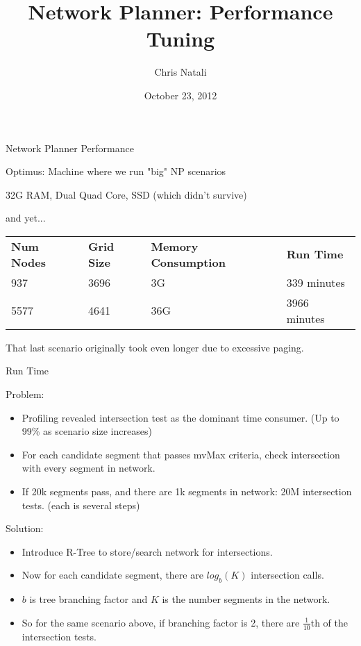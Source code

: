 \documentclass{beamer}
\title{Network Planner:  Performance Tuning}
\author{Chris Natali}
\institute{Modi Labs at Columbia University}
\date{October 23, 2012}
\begin{document}
\begin{frame}
  \begin{center}
  Network Planner Performance
  \end{center}

  \bigskip

  Optimus:  Machine where we run "big" NP scenarios

  32G RAM, Dual Quad Core, SSD (which didn't survive)

  and yet... 
 
  \bigskip 
 
  \begin{tabular}{|l|l|l|l|}
    \textbf{Num Nodes} & \textbf{Grid Size} & \textbf{Memory Consumption} & \textbf{Run Time} \\
    937 & 3696 & 3G  & 339 minutes \\
    5577 & 4641 & 36G  & 3966 minutes \\
  \end{tabular}

  \bigskip
 
  That last scenario originally took even longer due to excessive paging.  
\end{frame}

\begin{frame}{Run Time}
  
  Problem:
  \begin{itemize}
  \item[] {\small Profiling revealed intersection test as the dominant time consumer. (Up to 99\% as scenario size increases)}
  \item[] {\small For each candidate segment that passes mvMax criteria, check intersection with every segment in network.}
  \item[] {\small If 20k segments pass, and there are 1k segments in network:  20M intersection tests. (each is several steps)}
  \end{itemize}

  Solution:
  \begin{itemize}
  \item[] {\small Introduce R-Tree to store/search network for intersections.}
  \item[] {\small Now for each candidate segment, there are $log_b(K)$ intersection calls.}
  \item[] {\small $b$ is tree branching factor and $K$ is the number segments in the network.} 
  \item[] {\small So for the same scenario above, if branching factor is 2, there are $\frac{1}{10}$th of the intersection tests.}   
  \end{itemize}

\end{frame}
\end{document}
